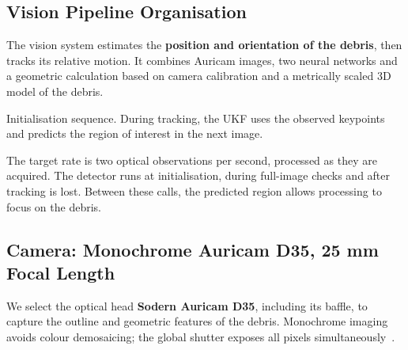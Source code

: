 \subsection{Vision Pipeline Organisation}
The vision system estimates the \textbf{position and orientation of the debris}, 
then tracks its relative motion. It combines Auricam images, 
two neural networks and a geometric calculation based on camera calibration and a metrically scaled 3D model of the debris.

\begin{center}
\end{center}
{\small Initialisation sequence. During tracking, the UKF uses the observed keypoints and predicts the region of interest in the next image.}

The target rate is two optical observations per second, processed as they are acquired. The detector runs at initialisation, during full-image checks and after tracking is lost. 
Between these calls, the predicted region allows processing to focus on the debris.

\subsection{Camera: Monochrome Auricam D35, 25 mm Focal Length}
We select the optical head \textbf{Sodern Auricam D35}, including its baffle,
 to capture the outline and geometric features of the debris. Monochrome imaging avoids colour demosaicing;
 the global shutter exposes all pixels simultaneously~\cite{sodern_auricam}.

